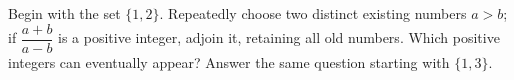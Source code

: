 Begin with the set $\{1,2\}$. Repeatedly choose two distinct existing numbers $a>b$; if $\dfrac{a+b}{a-b}$ is a positive integer, adjoin it, retaining all old numbers. Which positive integers can eventually appear? Answer the same question starting with $\{1,3\}$.
